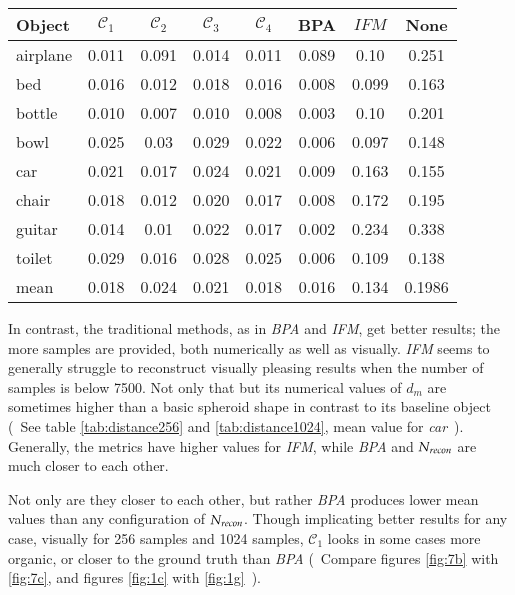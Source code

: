 \begin{center}
     \label{tab:distance1024} 
    \begin{tabular}{| l  | c | c | c | c | c | c || c |}
        \hline
        Object& $\mathcal{C}_1$ & $\mathcal{C}_2$ & $\mathcal{C}_3$ & $\mathcal{C}_4$ & BPA & $IFM$ & None\\ \hline
        airplane&0.011&0.091&0.014&0.011&0.089&0.10 & 0.251\\\hline
        bed&0.016&0.012&0.018&0.016&0.008&0.099 & 0.163\\        \hline
        bottle&0.010&0.007&0.010&0.008&0.003&0.10 & 0.201\\        \hline
        bowl&0.025&0.03&0.029&0.022&0.006&0.097& 0.148\\        \hline
        car&0.021&0.017&0.024&0.021&0.009&0.163& 0.155\\        \hline
        chair&0.018&0.012&0.020&0.017&0.008&0.172& 0.195\\        \hline
        guitar&0.014&0.01&0.022&0.017&0.002&0.234 & 0.338\\        \hline
        toilet&0.029&0.016&0.028&0.025&0.006&0.109 & 0.138\\        \hline\hline
        mean&0.018&0.024&0.021&0.018&0.016&0.134 & 0.1986\\        \hline
    \end{tabular}
\end{center}

    In contrast, the traditional methods, as in \emph{BPA} and \emph{IFM}, get better results; the more samples are provided, both
    numerically as well as visually.
    \emph{IFM} seems to generally struggle to reconstruct visually pleasing results when the number of samples is below 7500.
    Not only that but its numerical values of $d_m$ are sometimes higher than a basic spheroid shape in contrast to its baseline 
    object (~See table \ref{tab:distance256} and \ref{tab:distance1024},  mean value for \emph{car}~). Generally, the metrics have
    higher values for \emph{IFM}, while \emph{BPA} and $\emph{N}_{recon}$ are much closer to each other.

    Not only are they closer to each other, but rather \emph{BPA} produces lower mean values than any configuration of  $\emph{N}_{recon}$.
    Though implicating better results for any case, visually for 256 samples and 1024 samples, $\mathcal{C}_1$ looks in some cases more
    organic, or closer to the ground truth than \emph{BPA} (~Compare figures \ref{fig:7b} with \ref{fig:7c}, and figures \ref{fig:1c} 
    with \ref{fig:1g}~).

